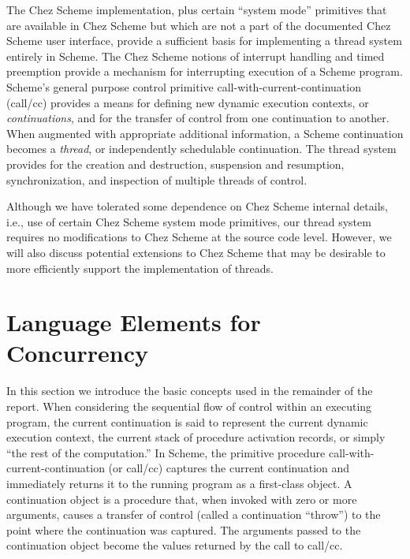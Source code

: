 \documentclass{article}
\begin{document}
The Chez Scheme implementation, plus certain ``system mode''
primitives that are available in Chez Scheme but which are not a part
of the documented Chez Scheme user interface, provide a sufficient
basis for implementing a thread system entirely in Scheme.  The Chez
Scheme notions of interrupt handling and timed preemption provide a
mechanism for interrupting execution of a Scheme program. Scheme's
general purpose control primitive {\sf call-with-current-continuation}
({\sf call/cc}) provides a means for defining new dynamic execution
contexts, or {\em continuations}, and for the transfer of control from
one continuation to another.  When augmented with appropriate
additional information, a Scheme continuation becomes a {\em thread},
or independently schedulable continuation.  The thread system provides
for the creation and destruction, suspension and resumption,
synchronization, and inspection of multiple threads of control.

Although we have tolerated some dependence on Chez Scheme internal
details, i.e., use of certain Chez Scheme system mode primitives,
our thread system requires no modifications to Chez Scheme at the
source code level.  However, we will also discuss potential extensions
to Chez Scheme that may be desirable to more efficiently support the
implementation of threads.



\section{Language Elements for Concurrency}


In this section we introduce the basic concepts used in the remainder
of the report.  When considering the sequential flow of control within
an executing program, the current continuation is said to represent
the current dynamic execution context, the current stack of procedure
activation records, or simply ``the rest of the computation.''  In
Scheme, the primitive procedure {\sf call-with-current-continuation}
(or {\sf call/cc}) captures the current continuation and immediately
returns it to the running program as a first-class object.  A
continuation object is a procedure that, when invoked with zero or
more arguments, causes a transfer of control (called a continuation
``throw'') to the point where the continuation was captured.  The
arguments passed to the continuation object become the values returned
by the call to {\sf call/cc}.
\end{document}
